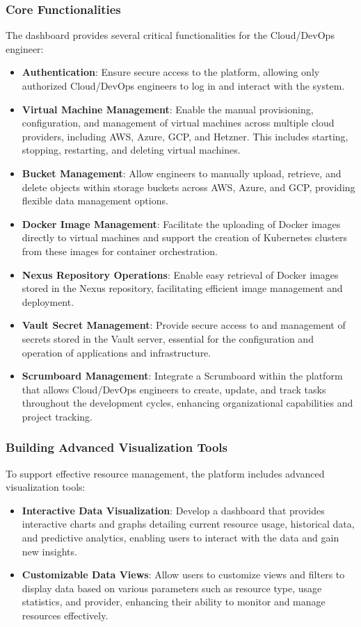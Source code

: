 \subsubsection{Core Functionalities}
The dashboard provides several critical functionalities for the Cloud/DevOps engineer:
\begin{itemize}
    \item \textbf{Authentication}: Ensure secure access to the platform, allowing only authorized Cloud/DevOps engineers to log in and interact with the system.
    \item \textbf{Virtual Machine Management}: Enable the manual provisioning, configuration, and management of virtual machines across multiple cloud providers, including AWS, Azure, GCP, and Hetzner. This includes starting, stopping, restarting, and deleting virtual machines.
    \item \textbf{Bucket Management}: Allow engineers to manually upload, retrieve, and delete objects within storage buckets across AWS, Azure, and GCP, providing flexible data management options.
    \item \textbf{Docker Image Management}: Facilitate the uploading of Docker images directly to virtual machines and support the creation of Kubernetes clusters from these images for container orchestration.
    \item \textbf{Nexus Repository Operations}: Enable easy retrieval of Docker images stored in the Nexus repository, facilitating efficient image management and deployment.
    \item \textbf{Vault Secret Management}: Provide secure access to and management of secrets stored in the Vault server, essential for the configuration and operation of applications and infrastructure.
    \item \textbf{Scrumboard Management}: Integrate a Scrumboard within the platform that allows Cloud/DevOps engineers to create, update, and track tasks throughout the development cycles, enhancing organizational capabilities and project tracking.
\end{itemize}

\subsubsection{Building Advanced Visualization Tools}
To support effective resource management, the platform includes advanced visualization tools:
\begin{itemize}
    \item \textbf{Interactive Data Visualization}: Develop a dashboard that provides interactive charts and graphs detailing current resource usage, historical data, and predictive analytics, enabling users to interact with the data and gain new insights.
    \item \textbf{Customizable Data Views}: Allow users to customize views and filters to display data based on various parameters such as resource type, usage statistics, and provider, enhancing their ability to monitor and manage resources effectively.
\end{itemize}

